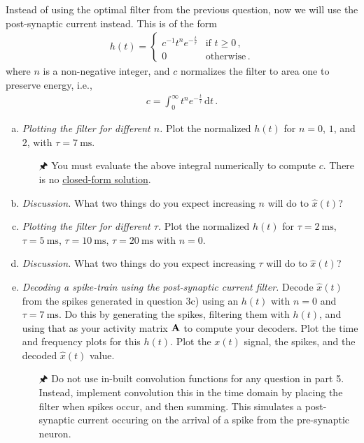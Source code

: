 	Instead of using the optimal filter from the previous question, now we will use the post-synaptic current instead. This is of the form
	\begin{align*}
		h(t)= \begin{cases}
			c^{-1} t^n e^{-\frac{t}\tau} & \text{if } t \geq 0 \,, \\
			0 & \text{otherwise} \,.
		\end{cases}
	\end{align*}
	where $n$ is a non-negative integer, and $c$ normalizes the filter to area one to preserve energy, i.e.,
	\begin{align*}
		c = \int_0^\infty t^n e^{-\frac{t}\tau} \,\mathrm{d}t \,.
	\end{align*}
	\begin{enumerate}[a)]
		\item {} \textit{Plotting the filter for different $n$.} Plot the normalized $h(t)$ for $n=0$, $1$, and $2$, with $\tau=\SI{7}{\milli\second}$.
		\begin{itemize}
			\item[\symbolfont 🖈] You must evaluate the above integral numerically to compute $c$. There is no \href{http://mathworld.wolfram.com/Closed-FormSolution.html}{closed-form solution}.
		\end{itemize}
		\item {} \textit{Discussion.} What two things do you expect increasing $n$ will do to $\hat{x}(t)$?
		\item {} \textit{Plotting the filter for different $\tau$.} Plot the normalized $h(t)$ for $\tau=\SI{2}{\milli\second}$, $\tau=\SI{5}{\milli\second}$, $\tau=\SI{10}{\milli\second}$, $\tau=\SI{20}{\milli\second}$ with $n = 0$.
		\item {} \textit{Discussion.} What two things do you expect increasing $\tau$ will do to $\hat{x}(t)$?
		\item {} \textit{Decoding a spike-train using the post-synaptic current filter.} Decode $\hat{x}(t)$ from the spikes generated in question 3c) using an $h(t)$ with $n=0$ and $\tau=\SI{7}{\milli\second}$. Do this by generating the spikes, filtering them with $h(t)$, and using that as your activity matrix ${\mathbf{A}}$ to compute your decoders. Plot the time and frequency plots for this $h(t)$. Plot the $x(t)$ signal, the spikes, and the decoded $\hat{x}(t)$ value.
		\begin{itemize}
			\item[\symbolfont 🖈] Do not use in-built convolution functions for any question in part 5. Instead, implement convolution this in the time domain by placing the filter when spikes occur, and then summing. This simulates a post-synaptic current occuring on the arrival of a spike from the pre-synaptic neuron.

\end{itemize}
\end{enumerate}
